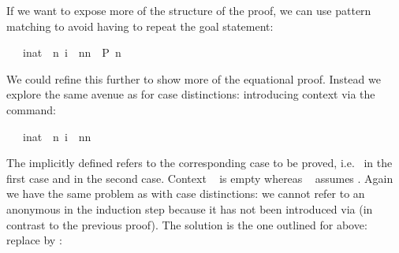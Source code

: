 \begin{isabellebody}
\begin{isamarkuptext}
If we want to expose more of the structure of the
proof, we can use pattern matching to avoid having to repeat the goal
statement:%
\end{isamarkuptext}%
\isamarkuptrue%
\ {\isachardoublequote}{}\ {\isacharasterisk}\ {\isacharparenleft}{\isasymSum}i{\isacharcolon}{\isacharcolon}nat\ {\isacharequal}\ {}{\isachardot}{\isachardot}{\isacharless}n{\isacharplus}{}{\isachardot}\ i{\isacharparenright}\ {\isacharequal}\ n{\isacharasterisk}{\isacharparenleft}n{\isacharplus}{}{\isacharparenright}{\isachardoublequote}\ {\isacharparenleft}\ {\isachardoublequote}{\isacharquery}P\ n{\isachardoublequote}{\isacharparenright}\isanewline
\isamarkupfalse%
\isamarkupfalse%
\isamarkupfalse%
\isamarkupfalse%
\isamarkupfalse%
\isamarkupfalse%
\isamarkupfalse%
\isamarkupfalse%
\isamarkupfalse%
\isamarkupfalse%
%
\begin{isamarkuptext}%
\noindent We could refine this further to show more of the equational
proof. Instead we explore the same avenue as for case distinctions:
introducing context via the  command:%
\end{isamarkuptext}%
\isamarkuptrue%
\ {\isachardoublequote}{}\ {\isacharasterisk}\ {\isacharparenleft}{\isasymSum}i{\isacharcolon}{\isacharcolon}nat\ {\isacharequal}\ {}{\isachardot}{\isachardot}{\isacharless}n{\isacharplus}{}{\isachardot}\ i{\isacharparenright}\ {\isacharequal}\ n{\isacharasterisk}{\isacharparenleft}n{\isacharplus}{}{\isacharparenright}{\isachardoublequote}\isanewline
\isamarkupfalse%
\isamarkupfalse%
\isamarkupfalse%
\isamarkupfalse%
\isamarkupfalse%
\isamarkupfalse%
\isamarkupfalse%
\isamarkupfalse%
\isamarkupfalse%
\isamarkupfalse%
%
\begin{isamarkuptext}%
\noindent The implicitly defined  refers to the
corresponding case to be proved, i.e.\  in the first case and
 in the second case. Context ~ is
empty whereas ~ assumes . Again we
have the same problem as with case distinctions: we cannot refer to an anonymous 
in the induction step because it has not been introduced via 
(in contrast to the previous proof). The solution is the one outlined for
 above: replace  by :%

\end{isamarkuptext}
\end{isabellebody}
